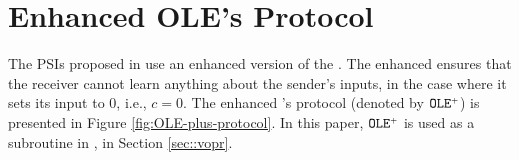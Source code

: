 

\section{Enhanced OLE's Protocol}\label{apndx:F-OLE-plus}



The PSIs proposed in \cite{GhoshN19} use an enhanced version of the  \ole.  The enhanced \ole ensures that the receiver cannot learn anything about the sender's inputs,  in the case where it sets its input to $0$, i.e., $c=0$. The enhanced \ole's protocol (denoted by $\mathtt{OLE}^{\scriptscriptstyle +}$) is presented in Figure \ref{fig:OLE-plus-protocol}. In this paper, $\mathtt{OLE}^{\scriptscriptstyle +}$ is used as a subroutine in \vopr, in Section \ref{sec::vopr}. 



%






